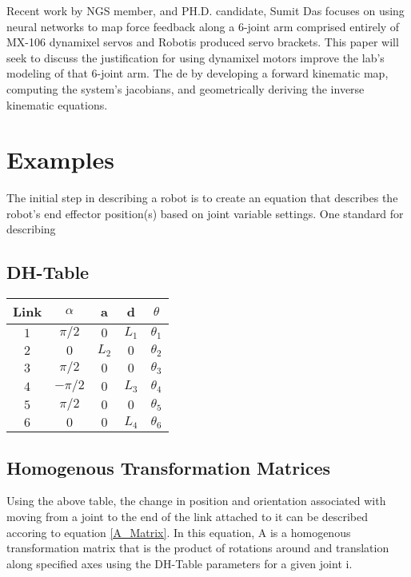 \documentclass[10pt,journal]{IEEEtran}
\begin{document}
Recent work by NGS member, and PH.D. candidate, Sumit Das focuses on using neural networks to map force feedback along a 6-joint arm comprised entirely of MX-106 dynamixel servos and Robotis produced servo brackets. This paper will seek to discuss the justification for using dynamixel motors improve the lab's modeling of that 6-joint arm. The de by developing a forward kinematic map, computing the system's jacobians, and geometrically deriving the inverse kinematic equations. 

\section{Examples} %
The initial step in describing a robot is to create an equation that describes the robot's end effector position(s) based on joint variable settings. One standard for describing 

\subsection{DH-Table}
\begin{center}
\begin{tabular}{ | c | c | c | c | c | } 
		\hline
		Link   & $\alpha$ & a     & d     & $\theta$   \\
\hline\hline
		$1$    & $\pi/2$  & $0$   & $L_1$ & $\theta_1$ \\
\hline
		$2$    & $0$      & $L_2$ & $0$   & $\theta_2$ \\
\hline
		$3$    & $\pi/2$  & $0$   & $0$   & $\theta_3$ \\
\hline
		$4$    & $-\pi/2$ & $0$   & $L_3$   & $\theta_4$ \\
\hline
		$5$    & $\pi/2$  & $0$   & $0$   & $\theta_5$ \\
\hline
		$6$    & $0$      & $0$   & $L_4$ & $\theta_6$ \\
		\hline
	\end{tabular}
\end{center}

\subsection{Homogenous Transformation Matrices}
Using the above table, the change in position and orientation
associated with moving from a joint to the end of the link
attached to it can be described accoring to equation \ref{A_Matrix}. In this
equation, A is a homogenous transformation matrix that is
the product of rotations around and translation along specified
axes using the DH-Table parameters for a given joint i.
\end{document}
